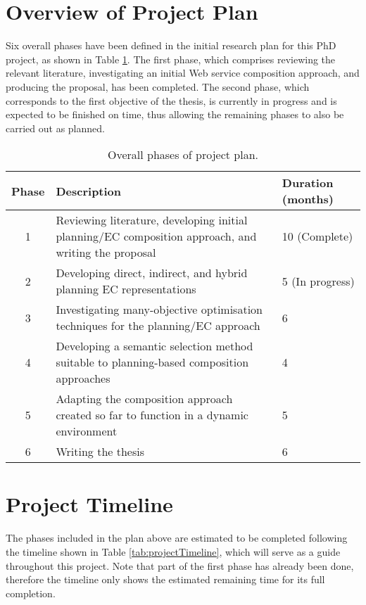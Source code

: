 \section{Overview of Project Plan}

Six overall phases have been defined in the initial research plan for this PhD project, as shown in Table \ref{tab:projectOverview}. The first phase, which comprises reviewing the relevant literature, investigating an initial Web service composition approach, and producing the proposal, has been completed. The second phase, which corresponds to the first objective of the thesis, is currently in progress and is expected to be finished on time, thus allowing the remaining phases to also be carried out as planned.

\begin{table}
\small
\centering
\caption{Overall phases of project plan.}
\vspace{0.2cm}
\begin{tabular}{|c|p{100mm}|l|}
\hline
Phase & Description & Duration (months) \\ \hline
1 & Reviewing literature, developing initial planning/EC composition approach, and writing the proposal & 10 (Complete)  \\
2 & Developing direct, indirect, and hybrid planning EC representations & 5 (In progress) \\
3 & Investigating many-objective optimisation techniques for the planning/EC approach & 6 \\
4 & Developing a semantic selection method suitable to planning-based composition approaches & 4 \\
5 & Adapting the composition approach created so far to function in a dynamic environment & 5 \\
6 & Writing the thesis & 6 \\ \hline
\end{tabular}
\label{tab:projectOverview}
\end{table}

\section{Project Timeline}

The phases included in the plan above are estimated to be completed following the timeline shown in Table \ref{tab:projectTimeline}, which will serve as a guide throughout this project. Note that part of the first phase has already been done, therefore the timeline only shows the estimated remaining time for its full completion.

